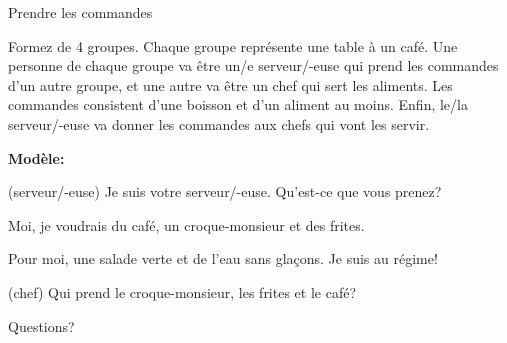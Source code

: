 \documentclass{beamer}
\begin{document}
  \begin{frame}{Prendre les commandes}

    {\small Formez de 4 groupes.
    Chaque groupe représente une table à un café.
    Une personne de chaque groupe va être un/e serveur/-euse qui prend les commandes d'un autre groupe, et une autre va être un chef qui sert les aliments.
    Les commandes consistent d'une \alert{boisson} et d'un \alert{aliment} au moins.
    Enfin, le/la serveur/-euse va donner les commandes aux chefs qui vont les servir.} \\

    \begin{description}
      \small
      \item[] \textbf{Modèle:}
      \item[E1:] (serveur/-euse) Je suis votre serveur/-euse. Qu'est-ce que vous prenez?
      \item[E2:] Moi, je voudrais du café, un croque-monsieur et des frites.
      \item[E3:] Pour moi, une salade verte et de l'eau sans glaçons. Je suis au régime!
      \item[E4:] (chef) Qui prend le croque-monsieur, les frites et le café?
    \end{description}
  \end{frame}

  \begin{frame}{}
    \begin{center}
      \Large Questions?
    \end{center}
  \end{frame}
\end{document}

